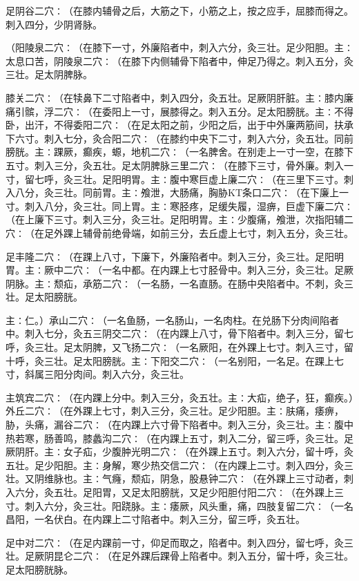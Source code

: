 \documentclass[a4paper,12pt,UTF8,twoside]{ctexbook}
\begin{document}
足阴谷二穴∶（在膝内辅骨之后，大筋之下，小筋之上，按之应手，屈膝而得之。刺入四分，少阴肾脉。

（阳陵泉二穴∶（在膝下一寸，外廉陷者中，刺入六分，灸三壮。足少阳胆。主∶太息口苦，阴陵泉二穴∶（在膝下内侧辅骨下陷者中，伸足乃得之。刺入五分，灸三壮。足太阴脾脉。

膝关二穴∶（在犊鼻下二寸陷者中，刺入四分，灸五壮。足厥阴肝脏。主∶膝内廉痛引髌，浮二穴∶（在委阳上一寸，展膝得之。刺入五分。足太阳膀胱。主∶不得卧，出汗，不得委阳二穴∶（在足太阳之前，少阳之后，出于中外廉两筋间，扶承下六寸。刺入七分，灸合阳二穴∶（在膝约中央下二寸，刺入六分，灸五壮。同前膀胱。主∶踝厥，癫疾，螈，地机二穴∶（一名脾舍。在别走上一寸一空，在膝下五寸。刺入三分，灸五壮。足太阴脾脉三里二穴∶（在膝下三寸，骨外廉。刺入一寸，留七呼，灸三壮。足阳明胃。主∶腹中寒巨虚上廉二穴∶（在三里下三寸。刺入八分，灸三壮。同前胃。主∶飧泄，大肠痛，胸胁KT条口二穴∶（在下廉上一寸。刺入八分，灸三壮。同上胃。主∶寒胫疼，足缓失履，湿痹，巨虚下廉二穴∶（在上廉下三寸。刺入三分，灸三壮。足阳明胃。主∶少腹痛，飧泄，次指阳辅二穴∶（在足外踝上辅骨前绝骨端，如前三分，去丘虚上七寸，刺入五分，灸三壮。

足丰隆二穴∶（在踝上八寸，下廉下，外廉陷者中。刺入三分，灸三壮。足阳明胃。主∶厥中二穴∶（一名中都。在内踝上七寸胫骨中。刺入三分，灸三壮。足厥阴脉。主∶颓疝，承筋二穴∶（一名肠，一名直肠。在肠中央陷者中。不刺，灸三壮。足太阳膀胱。

主∶仁。）承山二穴∶（一名鱼肠，一名肠山，一名肉柱。在兑肠下分肉间陷者中。刺入七分，灸五三阴交二穴∶（在内踝上八寸，骨下陷者中。刺入三分，留七呼，灸三壮。足太阴脾，又飞扬二穴∶（一名厥阳，在外踝上七寸。刺入三寸，留十呼，灸三壮。足太阳膀胱。主∶下阳交二穴∶（一名别阳，一名足。在踝上七寸，斜属三阳分肉间。刺入六分，灸三壮。

主筑宾二穴∶（在内踝上分中。刺入三分，灸五壮。主∶大疝，绝子，狂，癫疾。）外丘二穴∶（在外踝上七寸，刺入三分，灸三壮。足少阳胆。主∶肤痛，痿痹，胁，头痛，漏谷二穴∶（在内踝上六寸骨下陷者中。刺入三分，灸三壮。主∶腹中热若寒，肠善鸣，膝蠡沟二穴∶（在内踝上五寸，刺入二分，留三呼，灸三壮。足厥阴肝。主∶女子疝，少腹肿光明二穴∶（在外踝上五寸。刺入六分，留十呼，灸五壮。足少阳胆。主∶身解，寒少热交信二穴∶（在内踝上二寸。刺入四分，灸三壮。又阴维脉也。主∶气癃，颓疝，阴急，股悬钟二穴∶（在外踝上三寸动者，刺入六分，灸五壮。足阳胃，又足太阳膀胱，又足少阳胆付阳二穴∶（在外踝上三寸。刺入六分，灸三壮。阳跷脉。主∶痿厥，风头重，痛，四肢复留二穴∶（一名昌阳，一名伏白。在内踝上二寸陷者中。刺入三分，留三呼，灸五壮。

足中对二穴∶（在足内踝前一寸，仰足而取之，陷者中。刺入四分，留七呼，灸三壮。足厥阴昆仑二穴∶（在足外踝后踝骨上陷者中。刺入五分，留十呼，灸三壮。足太阳膀胱脉。
\end{document}
